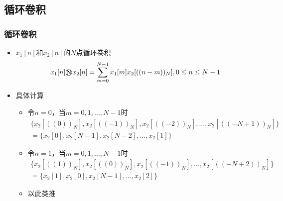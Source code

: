 \documentclass[CJKutf8,dvipsnames,table]{beamer}
\begin{document}
\begin{CJK*}{UTF8}{song}
  \section{循环卷积}
  
  \begin{frame}
    \frametitle{循环卷积}
    \begin{itemize}
    \item $x_1[n]$和$x_2[n]$的$N$点循环卷积
    \[
    	x_1[n] \raisebox{0pt}{\textcircled{\raisebox{-.9pt}{N}}} x_2[n]=\sum_{m=0}^{N-1}x_1[m]x_2[((n-m))_N], 0 \leq n \leq N-1
    \]    
    \item 具体计算
    	\begin{itemize}
		\item 令$n=0$，当$m=0, 1, \hdots, N-1$时
		\begin{align*}
			\{ x_2[((0))_N], x_2[((-1))_N], x_2[((-2))_N], \hdots, x_2[((-N+1))_N] \} & \\
		  = \{ x_2[0], x_2[N-1], x_2[N-2], \hdots, x_2[1] \} & 
		\end{align*}
		
		\item 令$n=1$，当$m=0, 1, \hdots, N-1$时
		\begin{align*}
			\{ x_2[((1))_N], x_2[((0))_N], x_2[((-1))_N], \hdots, x_2[((-N+2))_N] \} & \\
		  = \{ x_2[1], x_2[0], x_2[N-1], \hdots, x_2[2] \} & 
		\end{align*}	
		
		\item 以此类推	
		\end{itemize} 
	\end{itemize}
  \end{frame} 
        

\end{CJK*}
\end{document}
